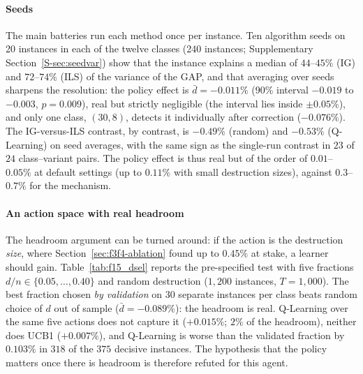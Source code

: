 \documentclass[final,3p,times,11pt,authoryear]{elsarticle}
\begin{document}
\paragraph{Seeds}
The main batteries run each method once per instance. Ten algorithm seeds on
20 instances in each of the twelve classes (240 instances; Supplementary
Section~\ref{S-sec:seedvar}) show that the instance explains a median of
$44$--$45\%$ (IG) and $72$--$74\%$ (ILS) of the variance of the GAP, and that averaging over
seeds sharpens the resolution: the policy effect is $\bar d=-0.011\%$ (90\%
interval $-0.019$ to $-0.003$, $p=0.009$), real but strictly negligible
(the interval lies inside $\pm0.05\%$), and only one class, $(30,8)$, detects it
individually after correction ($-0.076\%$). The IG-versus-ILS contrast, by
contrast, is $-0.49\%$ (random) and $-0.53\%$ (Q-Learning) on seed averages,
with the same sign as the single-run contrast in $23$ of $24$ class--variant
pairs. The policy effect is thus real but of the order of $0.01$--$0.05\%$ at
default settings (up to $0.11\%$ with small destruction sizes), against
$0.3$--$0.7\%$ for the mechanism.



\paragraph{An action space with real headroom}
The headroom argument can be turned around: if the action is the destruction
\emph{size}, where Section~\ref{sec:f3f4-ablation} found up to $0.45\%$ at stake,
a learner should gain. Table~\ref{tab:f15_dsel} reports the pre-specified test
with five fractions $d/n \in \{0.05,\ldots,0.40\}$ and random destruction
($1{,}200$ instances, $T=1{,}000$). The best fraction chosen \emph{by validation}
on 30 separate instances per class beats random choice of $d$ out of sample
($\bar d=-0.089\%$): the headroom is real. Q-Learning over the same five
actions does not capture it ($+0.015\%$; $2\%$ of the headroom), neither does
UCB1 ($+0.007\%$), and Q-Learning is worse than the validated fraction by
$0.103\%$ in $318$ of the $375$ decisive instances. The hypothesis that the
policy matters once there is headroom is therefore refuted for this agent.


\end{document}
